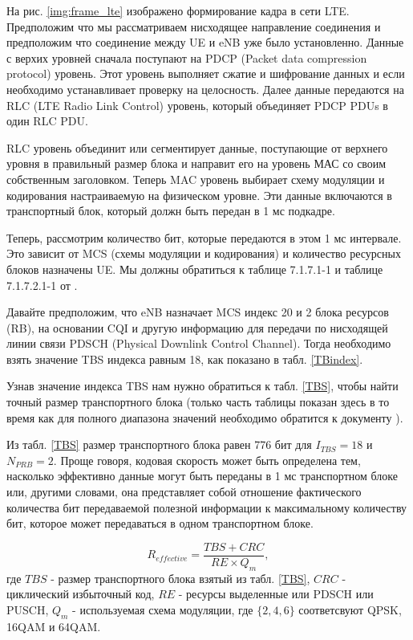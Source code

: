 На рис. \ref{img:frame_lte} изображено формирование кадра в сети LTE. Предположим что мы рассматриваем нисходящее направление соединения и предположим что соединение между UE и eNB уже было установленно. Данные с верхих уровней сначала поступают на PDCP (Packet data compression protocol) уровень. Этот уровень выполняет сжатие и шифрование данных и если необходимо устанавливает проверку на целосность. Далее данные передаются на RLC (LTE Radio Link Control) уровень, который объединяет PDCP PDUs в один RLC PDU.

RLC уровень объединит или сегментирует данные, поступающие от верхнего уровня в правильный размер блока и направит его на уровень МАС со своим собственным заголовком. Теперь MAC уровень выбирает схему модуляции и кодирования настраиваемую на физическом уровне. Эти данные включаются в транспортный блок, который должн быть передан в 1 мс подкадре.

Теперь, рассмотрим количество бит, которые передаются в этом 1 мс интервале. Это зависит от MCS (схемы модуляции и кодирования) и количество ресурсных блоков назначены UE. Мы должны обратиться к таблице 7.1.7.1-1 и таблице 7.1.7.2.1-1 от \cite{3GPPTS36213}.

Давайте предположим, что eNB назначает MCS индекс 20 и 2 блока ресурсов (RB), на основании CQI и другую информацию для передачи по нисходящей линии связи PDSCH (Physical Downlink Control Channel). Тогда необходимо взять значение TBS индекса равным 18, как показано в табл. \ref{TBindex}.

Узнав значение индекса TBS нам нужно обратиться к табл. \ref{TBS}, чтобы найти точный размер транспортного блока (только часть таблицы показан здесь в то время как для полного диапазона значений необходимо обратится к документу \cite{3GPPTS36213}).

Из табл. \ref{TBS} размер транспортного блока равен 776 бит для $I_{TBS}=18$ и  $N_{PRB}=2$. Проще говоря, кодовая скорость может быть определена тем, насколько эффективно данные могут быть переданы в 1 мс транспортном блоке или, другими словами, она представляет собой отношение фактического количества бит передаваемой полезной информации к максимальному количеству бит, которое может передаваться в одном транспортном блоке.


\begin{equation}\label{eq:Reffective}
R_{effective}=\frac{TBS+CRC}{RE \times Q_{m}},
\end{equation}
\noindent где $TBS$ - размер транспортного блока взятый из табл. \ref{TBS}, $CRC$ - циклический избыточный код, $RE$ - ресурсы выделенные или PDSCH или PUSCH, $Q_{m}$ - используемая  схема модуляции, где $\{2,4,6\}$ соответсвуют QPSK, 16QAM и 64QAM.

